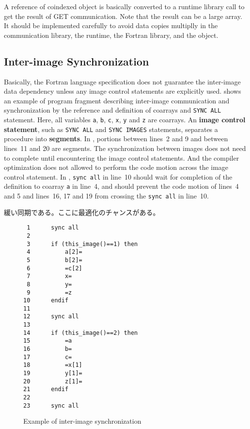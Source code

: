 \requirement
A reference of coindexed object is basically converted to a runtime library call
to get the result of GET communication. 
Note that the result can be a large array.
It should be implemented carefully to avoid data copies multiplly in the
communication library, the runtime, the Fortran library, and the object.


\subsection{Inter-image Synchronization}\label{spec-sync}
Basically, the Fortran language specification does not guarantee the inter-image 
data dependency unless any image control statements are explicitly used.
 shows an example of program fragment describing inter-image communication
and synchronization by the reference and definition of coarrays and {\tt SYNC ALL} statement.
Here, all variables {\tt a}, {\tt b}, {\tt c}, {\tt x}, {\tt y} and {\tt z} are coarrays.
%
An {\bf image control statement}, such as {\tt SYNC ALL} and {\tt SYNC IMAGES} statements, 
separates a procedure into {\bf segments}. In , portions between lines~2 and 9 and 
between lines~11 and 20 are segments.
The synchronization between images does not need to complete until encountering the 
image control statements. And the compiler optimization does not allowed to perform 
the code motion across the image control statement. In , 
{\tt sync all} in line~10 should wait for completion of the definition to coarray {\tt a} 
in line~4, and should prevent the code motion of lines~4 and 5 and lines~16, 17 and 19 
from crossing the {\tt sync all} in line~10.

緩い同期である。ここに最適化のチャンスがある。

\begin{figure}[hbt]
 \begin{center}
\begin{verbatim}
 1      sync all
 2
 3      if (this_image()==1) then
 4          a[2]=
 5          b[2]=
 6          =c[2]
 7          x=
 8          y=
 9          =z
10      endif
11
12      sync all
13
14      if (this_image()==2) then
15          =a
16          b=
17          c=
18          =x[1]
19          y[1]=
20          z[1]=
21      endif
22
23      sync all

\end{verbatim}
  \caption{Example of inter-image synchronization}
  \label{fig:sync-ex}
 \end{center}
\end{figure}



